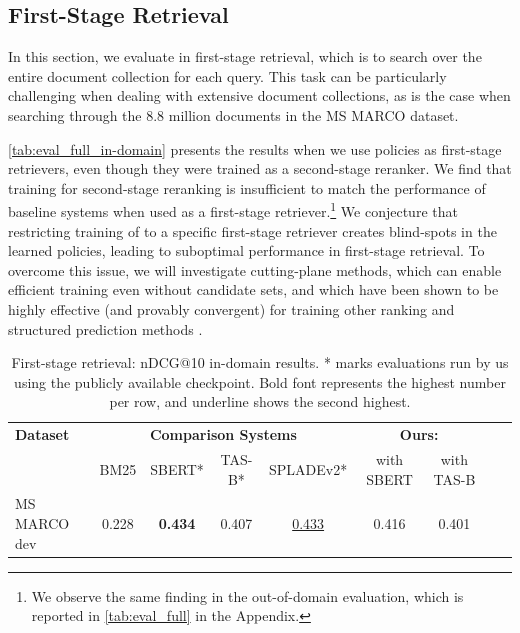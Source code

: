 \documentclass{article}
\begin{document}
\subsection{First-Stage Retrieval} \label{sec:first-stage}
In this section, we evaluate \alg{} in first-stage retrieval, which is to search over the entire document collection for each query. This task can be particularly challenging when dealing with extensive document collections, as is the case when searching through the 8.8 million documents in the MS MARCO dataset.

\autoref{tab:eval_full_in-domain} presents the results when we use \alg{} policies as first-stage retrievers, even though they were trained as a second-stage reranker. 
We find that training \alg{} for second-stage reranking is insufficient to match the performance of baseline systems when used as a first-stage retriever.\footnote{We observe the same finding in the out-of-domain evaluation, which is reported in \autoref{tab:eval_full} in the Appendix.} We conjecture that restricting training of \alg{} to a specific first-stage retriever creates blind-spots in the learned policies, leading to suboptimal performance in first-stage retrieval. To overcome this issue, we will investigate cutting-plane methods, which can enable efficient training even without candidate sets, and which have been shown to be highly effective (and provably convergent) for training other ranking and structured prediction methods \citep{Joachims/06a,Joachims/etal/09a}.









\begin{table}[t!] 
    \vspace{-20pt}
    \caption{First-stage retrieval: nDCG@10 in-domain results. * marks evaluations run by us using the publicly available checkpoint. Bold font represents the highest number per row, and underline shows the second highest.}
    \vspace{5pt}
    \centering \small
    \begin{tabular}{l c c c c c c c c}
        \toprule
        \textbf{Dataset} & \multicolumn{4}{c}{\textbf{Comparison Systems}}  & \multicolumn{2}{c}{\textbf{Ours: \alg{}}} \\
            & BM25 & SBERT* & TAS-B* & SPLADEv2* & with SBERT & with TAS-B   \\ 
        \midrule
MS MARCO dev & 0.228 & \textbf{0.434} & 0.407 & \underline{0.433} & 0.416 & 0.401\\
        \bottomrule
    \end{tabular}
    \vspace{-8pt}
    \label{tab:eval_full_in-domain}
\end{table}
\end{document}
